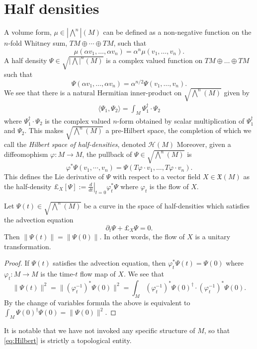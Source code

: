 \section{Half densities}
A volume form, $\mu \in \left| \bigwedge^n \right|(M)$ can be defined as a non-negative function on the $n$-fold Whitney sum, $TM \oplus \cdots \oplus TM$, such that
\[
	\mu( \alpha v_1, \dots, \alpha v_n) = \alpha^n \mu( v_1, \dots, v_n).
\]
A half density $\Psi \in  \sqrt{ \left| \bigwedge \right|^n(M) }$ is a complex valued function on $TM \oplus \dots \oplus TM$ such that
\[
	\Psi( \alpha v_1, \dots, \alpha v_n) = \alpha^{n/2} \Psi( v_1, \dots, v_n).
\]
We see that there is a natural Hermitian inner-product on $\sqrt{\bigwedge^n(M)}$ given by
\begin{align}
	\langle \Psi_1, \Psi_2 \rangle = \int_M \Psi_1^\dagger \cdot \Psi_2 \label{eq:Hilbert}
\end{align}
where $\Psi_1^\dagger \cdot \Psi_2$ is the complex valued $n$-form obtained by scalar multiplication of $\Psi_1^\dagger$ and $\Psi_2$.
This makes $\sqrt{ \bigwedge^n(M)}$ a pre-Hilbert space, the completion of which we call the \emph{Hilbert space of half-densities}, denoted $\mathcal{H}(M)$ \cite[See Appendix A]{BatesWeinstein1997}
Moreover, given a diffeomophism $\varphi: M \to M$, the pullback of $\Psi \in \sqrt{ \bigwedge^n(M)}$ is
\[
	\varphi^* \Psi( v_1, \cdots , v_n) = \Psi( T\varphi \cdot v_1, \dots, T\varphi \cdot v_n).
\]
This defines the Lie derivative of $\Psi$ with respect to a vector field $X \in \mathfrak{X}(M)$ as the half-density $\pounds_X[ \Psi] := \left. \frac{d}{dt} \right|_{t=0} \varphi_t^* \Psi$ where $\varphi_t$ is the flow of $X$.

\begin{proposition} \label{prop:half_density}
	Let $\Psi(t) \in \sqrt{ \bigwedge^n(M)}$ be a curve in the space of half-densities which satisfies the advection equation
	\[
		\partial_t \Psi + \pounds_X \Psi = 0.
	\]
	Then $\| \Psi(t) \| = \| \Psi(0) \|$.  In other words, the flow of $X$ is a unitary transformation.
\end{proposition}
\begin{proof}
	If $\Psi(t)$ satisfies the advection equation, then $\varphi_t^*\Psi(t) = \Psi(0)$ where $\varphi_t : M \to M$ is the time-$t$ flow map of $X$.  We see that
	\[
		\| \Psi(t) \|^2 = \| (\varphi_t^{-1})^* \Psi(0) \|^2 = \int_M (\varphi_t^{-1})^* \Psi(0)^\dagger \cdot (\varphi_t^{-1})^* \Psi(0).
	\]
	By the change of variables formula the above is equivalent to $\int_M \Psi(0)^\dagger \Psi(0) = \| \Psi(0) \|^2$.
\end{proof}
It is notable that we have not invoked any specific structure of $M$, so that \eqref{eq:Hilbert} is strictly a topological entity.

